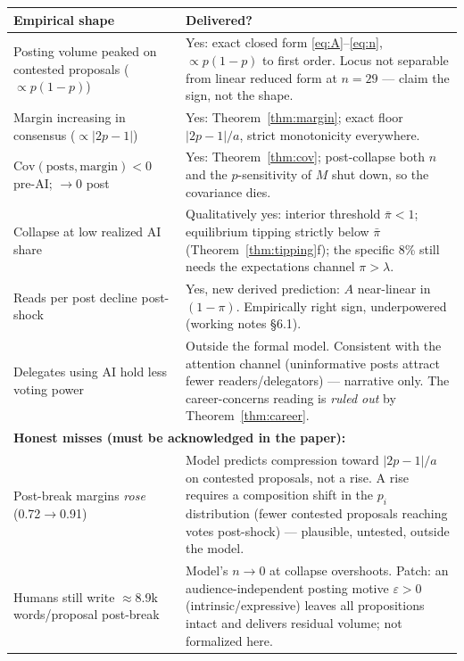 \documentclass[11pt]{article}
\theoremstyle{remark}
\newcommand{\Cov}{\mathrm{Cov}}
\begin{document}
\begin{center}
\begin{tabular}{p{5.6cm}p{8.6cm}}
\toprule
\textbf{Empirical shape} & \textbf{Delivered?}\\
\midrule
Posting volume peaked on contested proposals ($\propto p(1-p)$) &
Yes: exact closed form \eqref{eq:A}--\eqref{eq:n}, $\propto p(1-p)$ to first
order. Locus not separable from linear reduced form at $n=29$ --- claim the
sign, not the shape.\\[3pt]
Margin increasing in consensus ($\propto|2p-1|$) &
Yes: Theorem~\ref{thm:margin}; exact floor $|2p-1|/a$, strict monotonicity
everywhere.\\[3pt]
$\Cov(\text{posts},\text{margin})<0$ pre-AI; $\to0$ post &
Yes: Theorem~\ref{thm:cov}; post-collapse both $n$ and the $p$-sensitivity of
$M$ shut down, so the covariance dies.\\[3pt]
Collapse at low realized AI share &
Qualitatively yes: interior threshold $\bar\pi<1$; equilibrium tipping strictly
below $\bar\pi$ (Theorem~\ref{thm:tipping}f); the specific 8\% still needs the
expectations channel $\pi>\lambda$.\\[3pt]
Reads per post decline post-shock &
Yes, new derived prediction: $A$ near-linear in $(1-\pi)$. Empirically right
sign, underpowered (working notes \S6.1).\\[3pt]
Delegates using AI hold less voting power &
Outside the formal model. Consistent with the attention channel (uninformative
posts attract fewer readers/delegators) --- narrative only. The career-concerns
reading is \emph{ruled out} by Theorem~\ref{thm:career}.\\
\midrule
\multicolumn{2}{l}{\textbf{Honest misses (must be acknowledged in the paper):}}\\
\midrule
Post-break margins \emph{rose} (0.72$\to$0.91) &
Model predicts compression toward $|2p-1|/a$ on contested proposals, not a
rise. A rise requires a composition shift in the $p_i$ distribution (fewer
contested proposals reaching votes post-shock) --- plausible, untested, outside
the model.\\[3pt]
Humans still write $\approx$8.9k words/proposal post-break &
Model's $n\to0$ at collapse overshoots. Patch: an audience-independent posting
motive $\varepsilon>0$ (intrinsic/expressive) leaves all propositions intact
and delivers residual volume; not formalized here.\\
\bottomrule
\end{tabular}
\end{center}
\end{document}
